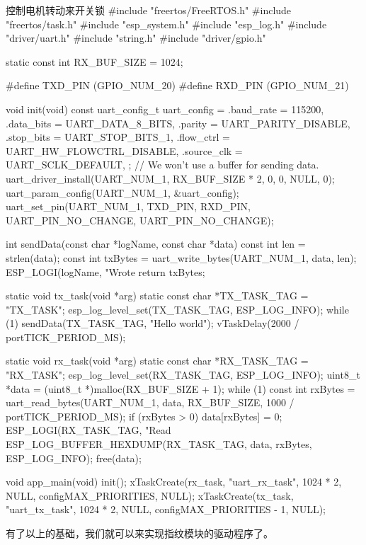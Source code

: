 \documentclass[lang=cn,newtx,10pt,scheme=chinese]{elegantbook}
\begin{document}
\begin{mycode}{控制电机转动来开关锁}
#include "freertos/FreeRTOS.h"
#include "freertos/task.h"
#include "esp_system.h"
#include "esp_log.h"
#include "driver/uart.h"
#include "string.h"
#include "driver/gpio.h"

static const int RX_BUF_SIZE = 1024;

#define TXD_PIN (GPIO_NUM_20)
#define RXD_PIN (GPIO_NUM_21)

void init(void)
{
    const uart_config_t uart_config = {
        .baud_rate = 115200,
        .data_bits = UART_DATA_8_BITS,
        .parity = UART_PARITY_DISABLE,
        .stop_bits = UART_STOP_BITS_1,
        .flow_ctrl = UART_HW_FLOWCTRL_DISABLE,
        .source_clk = UART_SCLK_DEFAULT,
    };
    // We won't use a buffer for sending data.
    uart_driver_install(UART_NUM_1, RX_BUF_SIZE * 2, 0, 0, NULL, 0);
    uart_param_config(UART_NUM_1, &uart_config);
    uart_set_pin(UART_NUM_1, TXD_PIN, RXD_PIN, UART_PIN_NO_CHANGE, UART_PIN_NO_CHANGE);
}

int sendData(const char *logName, const char *data)
{
    const int len = strlen(data);
    const int txBytes = uart_write_bytes(UART_NUM_1, data, len);
    ESP_LOGI(logName, "Wrote %
    return txBytes;
}

static void tx_task(void *arg)
{
    static const char *TX_TASK_TAG = "TX_TASK";
    esp_log_level_set(TX_TASK_TAG, ESP_LOG_INFO);
    while (1)
    {
        sendData(TX_TASK_TAG, "Hello world");
        vTaskDelay(2000 / portTICK_PERIOD_MS);
    }
}

static void rx_task(void *arg)
{
    static const char *RX_TASK_TAG = "RX_TASK";
    esp_log_level_set(RX_TASK_TAG, ESP_LOG_INFO);
    uint8_t *data = (uint8_t *)malloc(RX_BUF_SIZE + 1);
    while (1)
    {
        const int rxBytes = uart_read_bytes(UART_NUM_1, data, RX_BUF_SIZE, 1000 / portTICK_PERIOD_MS);
        if (rxBytes > 0)
        {
            data[rxBytes] = 0;
            ESP_LOGI(RX_TASK_TAG, "Read %
            ESP_LOG_BUFFER_HEXDUMP(RX_TASK_TAG, data, rxBytes, ESP_LOG_INFO);
        }
    }
    free(data);
}

void app_main(void)
{
    init();
    xTaskCreate(rx_task, "uart_rx_task", 1024 * 2, NULL, configMAX_PRIORITIES, NULL);
    xTaskCreate(tx_task, "uart_tx_task", 1024 * 2, NULL, configMAX_PRIORITIES - 1, NULL);
}
\end{mycode}

有了以上的基础，我们就可以来实现指纹模块的驱动程序了。
\end{document}
